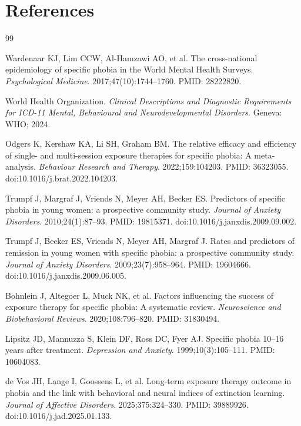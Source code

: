 \documentclass[11pt]{article}
\begin{document}
\section*{References}
\begin{thebibliography}{99}

Wardenaar KJ, Lim CCW, Al-Hamzawi AO, et al. The cross-national epidemiology of specific phobia in the World Mental Health Surveys. \textit{Psychological Medicine}. 2017;47(10):1744--1760. PMID: 28222820.

World Health Organization. \textit{Clinical Descriptions and Diagnostic Requirements for ICD-11 Mental, Behavioural and Neurodevelopmental Disorders}. Geneva: WHO; 2024.

Odgers K, Kershaw KA, Li SH, Graham BM. The relative efficacy and efficiency of single- and multi-session exposure therapies for specific phobia: A meta-analysis. \textit{Behaviour Research and Therapy}. 2022;159:104203. PMID: 36323055. doi:10.1016/j.brat.2022.104203.

Trumpf J, Margraf J, Vriends N, Meyer AH, Becker ES. Predictors of specific phobia in young women: a prospective community study. \textit{Journal of Anxiety Disorders}. 2010;24(1):87--93. PMID: 19815371. doi:10.1016/j.janxdis.2009.09.002.

Trumpf J, Becker ES, Vriends N, Meyer AH, Margraf J. Rates and predictors of remission in young women with specific phobia: a prospective community study. \textit{Journal of Anxiety Disorders}. 2009;23(7):958--964. PMID: 19604666. doi:10.1016/j.janxdis.2009.06.005.

Bohnlein J, Altegoer L, Muck NK, et al. Factors influencing the success of exposure therapy for specific phobia: A systematic review. \textit{Neuroscience and Biobehavioral Reviews}. 2020;108:796--820. PMID: 31830494.

Lipsitz JD, Mannuzza S, Klein DF, Ross DC, Fyer AJ. Specific phobia 10--16 years after treatment. \textit{Depression and Anxiety}. 1999;10(3):105--111. PMID: 10604083.

de Vos JH, Lange I, Goossens L, et al. Long-term exposure therapy outcome in phobia and the link with behavioral and neural indices of extinction learning. \textit{Journal of Affective Disorders}. 2025;375:324--330. PMID: 39889926. doi:10.1016/j.jad.2025.01.133.


\end{thebibliography}
\end{document}
